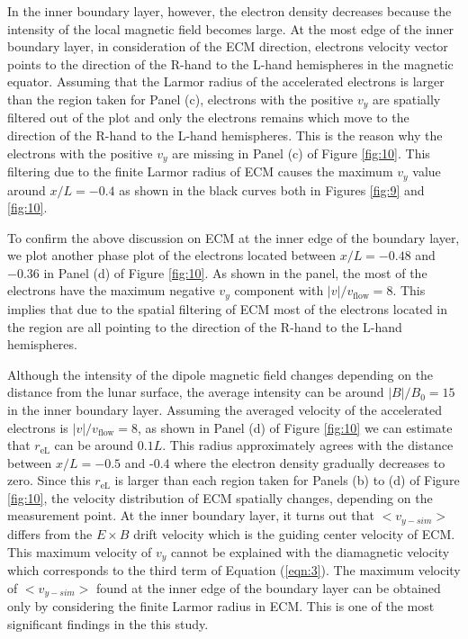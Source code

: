 \documentclass[draft,jgrga]{agutex2015}
\begin{document}
\begin{article}
%  


In the inner boundary layer, however, 
the electron density decreases because the intensity of the
local magnetic field becomes large.
At the most edge of the inner boundary layer,
in consideration of the ECM direction,
electrons velocity vector points to the direction
of the R-hand to the L-hand hemispheres in the magnetic equator.
Assuming that the Larmor radius of the accelerated electrons
is larger than the region taken for Panel (c), 
electrons with the positive $v_y$ are spatially filtered out of the plot
and only the electrons remains which move to the direction
of the R-hand to the L-hand hemispheres.
This is the reason why the electrons with the positive $v_y$ 
are missing in Panel (c) of Figure \ref{fig:10}.
This filtering due to the finite Larmor radius of ECM 
causes the maximum $v_y$ value around $x/L = -0.4$ as
shown in the black curves both in Figures \ref{fig:9} and \ref{fig:10}. 

To confirm the above discussion on ECM 
at the inner edge of the boundary layer,
we plot another phase plot of the electrons located between 
$x/L = -0.48$ and $-0.36$ in Panel (d) of Figure \ref{fig:10}.
As shown in the panel, 
the most of the electrons have the maximum negative $v_y$ component 
with $|v|/v_\mathrm{flow}=8$. 
This implies that due to the spatial filtering of ECM 
most of the electrons located in the region 
are all pointing to the direction
of the R-hand to the L-hand hemispheres. 

Although the intensity of the dipole magnetic field changes depending on 
the distance from the lunar surface, 
the average intensity can be around $|B|/B_{\mathrm{0}}=15$ in the inner boundary layer.
Assuming the averaged velocity of the accelerated electrons is 
$|v|/v_\mathrm{flow}=8$, as shown in Panel (d) of Figure \ref{fig:10} 
we can estimate that $r_\mathrm{eL}$ can be around $0.1L$.
This radius approximately agrees with the distance 
between $x/L = -0.5$ and -0.4 where
the electron density gradually decreases to zero.
Since this $r_\mathrm{eL}$ is larger than each region 
taken for Panels (b) to (d) of Figure \ref{fig:10}, 
the velocity distribution of ECM spatially changes,
depending on the measurement point.
At the inner boundary layer,
it turns out that $<v_{y-sim}>$ differs from the $E \times B$ drift velocity
which is the guiding center velocity of ECM.
This maximum velocity of $v_y$ cannot be explained with 
the diamagnetic velocity which corresponds
to the third term of Equation (\ref{eqn:3}). 
The maximum velocity of $<v_{y-sim}>$ found at the inner edge of the
boundary layer can be obtained only by considering the finite Larmor radius in ECM. 
This is one of the most significant findings in the this study.


\end{article}
\end{document}
